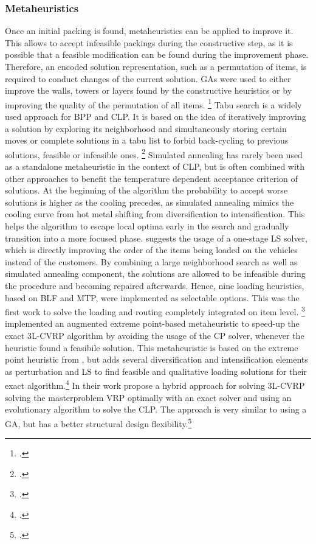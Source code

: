 \subsubsection{Metaheuristics}
Once an initial packing is found, metaheuristics can be applied to improve it.
This allows to accept infeasible packings during the constructive step,
as it is possible that a feasible modification can be found during the improvement phase.
Therefore, an encoded solution representation, such as a permutation of items, is required
to conduct changes of the current solution. \Glspl{GA} were
used to either improve the walls, towers or layers found by the constructive heuristics
or by improving the quality of the permutation of all items. \footcite[cf.][]{gehring_genetic_1997}
Tabu search is a widely used approach for \gls{BPP} and \gls{CLP}. It is based on
the idea of iteratively improving a solution by exploring its neighborhood and simultaneously
storing certain moves or complete solutions in a tabu list to forbid back-cycling to
previous solutions, feasible or infeasible ones. \footcite[cf.][p. 344f]{gendreau_tabu_2006}
Simulated annealing has rarely been used as a standalone metaheuristic in the context of \gls{CLP}, but is often
combined with other approaches to benefit the temperature dependent acceptance criterion of
solutions. At the beginning of the algorithm the probability
to accept worse solutions is higher as the cooling precedes, as simulated annealing mimics the cooling curve from hot metal shifting from diversification to
intensification. This helps the algorithm to escape local optima
early in the search and gradually transition into a more focused phase. \cite{ceschia_local_2013} suggests
the usage of a one-stage \gls{LS} solver, which is directly improving the order of the items being
loaded on the vehicles instead of the customers. By combining a large neighborhood search as
well as simulated annealing component, the solutions are allowed to be infeasible during the procedure and becoming repaired afterwards.
Hence, nine loading heuristics, based on \gls{BLF} and \gls{MTP}, were implemented as selectable options.
This was the first work to
solve the loading and routing completely integrated on item level. \footcite[cf.][pp. 1142--1145]{ceschia_local_2013}
\cite{tamke_branch-and-cut_2024} implemented an augmented extreme point-based metaheuristic
to speed-up the exact \gls{3L-CVRP} algorithm by avoiding the usage of the \gls{CP} solver, whenever the heuristic
found a feasibile solution. This metaheuristic is based on the extreme point heuristic from \cite{zhang_evolutionary_2015},
but adds several diversification and intensification elements as perturbation and \gls{LS} to find
feasible and qualitative loading solutions for their exact algorithm.\footcite[cf.][pp. 11--13]{tamke_branch-and-cut_2024}
In their work \cite{kucuk_constraint_2022} propose a hybrid approach for solving \gls{3L-CVRP} solving the
masterproblem \gls{VRP} optimally with an exact solver and using an evolutionary algorithm
to solve the \gls{CLP}. The approach is very similar to using a \gls{GA}, but
has a better structural design flexibility.\footcite[cf.][pp. 5--8]{kucuk_constraint_2022}


